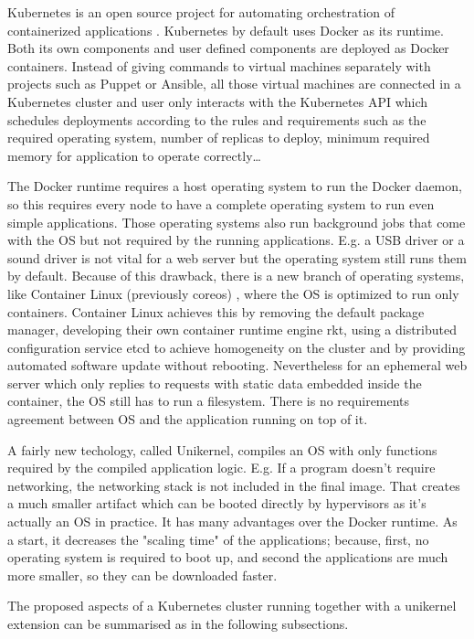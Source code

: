 Kubernetes is an open source project for automating orchestration of containerized applications \cite{Hightower:2017:KUR:3175917}. Kubernetes by default uses Docker as its runtime. Both its own components and user defined components are deployed as Docker containers. Instead of giving commands to virtual machines separately with projects such as Puppet or Ansible, all those virtual machines are connected in a Kubernetes cluster and user only interacts with the Kubernetes API which schedules deployments according to the rules and requirements such as the required operating system, number of replicas to deploy, minimum required memory for application to operate correctly\ldots

The Docker runtime requires a host operating system to run the Docker daemon, so this requires every node to have a complete operating system to run even simple applications. Those operating systems also run background jobs that come with the OS but not required by the running applications. E.g. a USB driver or a sound driver is not vital for a web server but the operating system still runs them by default. Because of this drawback, there is a new branch of operating systems, like Container Linux (previously coreos) \cite{coreos}, where the OS is optimized to run only containers. Container Linux achieves this by removing the default package manager, developing their own container runtime engine rkt, using a distributed configuration service etcd to achieve homogeneity on the cluster and by providing automated software update without rebooting. Nevertheless for an ephemeral web server which only replies to requests with static data embedded inside the container, the OS still has to run a filesystem. There is no requirements agreement between OS and the application running on top of it.

A fairly new techology, called Unikernel, compiles an OS with only functions required by the compiled application logic. E.g. If a program doesn't require networking, the networking stack is not included in the final image. That creates a much smaller artifact which can be booted directly by hypervisors as it's actually an OS in practice. It has many advantages over the Docker runtime. As a start, it decreases the "scaling time" \cite{Podolskiy:2017:QCA:3069383.3069390} of the applications; because, first, no operating system is required to boot up, and second the applications are much more smaller, so they can be downloaded faster.

The proposed aspects of a Kubernetes cluster running together with a unikernel extension can be summarised as in the following subsections.

